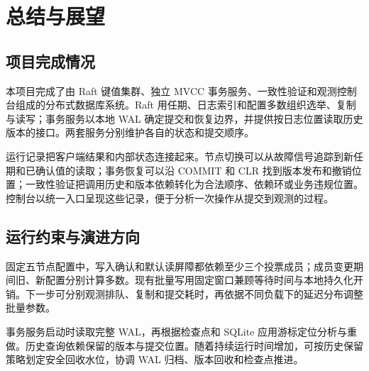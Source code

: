 \clearpage
\section{总结与展望}

\subsection{项目完成情况}
本项目完成了由 Raft 键值集群、独立 MVCC 事务服务、一致性验证和观测控制台组成的分布式数据库系统。Raft 用任期、日志索引和配置多数组织选举、复制与读写；事务服务以本地 WAL 确定提交和恢复边界，并提供按日志位置读取历史版本的接口。两套服务分别维护各自的状态和提交顺序。

运行记录把客户端结果和内部状态连接起来。节点切换可以从故障信号追踪到新任期和已确认值的读取；事务恢复可以沿 COMMIT 和 CLR 找到版本发布和撤销位置；一致性验证把调用历史和版本依赖转化为合法顺序、依赖环或业务违规位置。控制台以统一入口呈现这些记录，便于分析一次操作从提交到观测的过程。

\subsection{运行约束与演进方向}
固定五节点配置中，写入确认和默认读屏障都依赖至少三个投票成员；成员变更期间旧、新配置分别计算多数。现有批量写用固定窗口兼顾等待时间与本地持久化开销。下一步可分别观测排队、复制和提交耗时，再依据不同负载下的延迟分布调整批量参数。

事务服务启动时读取完整 WAL，再根据检查点和 SQLite 应用游标定位分析与重做。历史查询依赖保留的版本与提交位置。随着持续运行时间增加，可按历史保留策略划定安全回收水位，协调 WAL 归档、版本回收和检查点推进。
